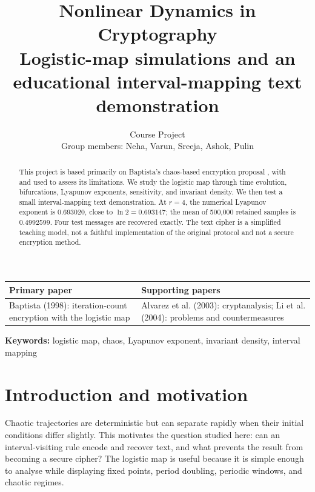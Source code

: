\documentclass[9pt]{article}
\title{Nonlinear Dynamics in Cryptography\\\large Logistic-map simulations and an educational interval-mapping text demonstration}
\author{Course Project\\\small Group members: Neha, Varun, Sreeja, Ashok, Pulin}\date{}
\begin{document}
\maketitle
\begin{abstract}
This project is based primarily on Baptista's chaos-based encryption proposal
\citep{Baptista1998}, with \citet{Alvarez2003} and \citet{Li2004} used to
assess its limitations. We study the logistic map through time evolution,
bifurcations, Lyapunov exponents, sensitivity, and invariant density. We then
test a small interval-mapping text demonstration. At $r=4$, the numerical
Lyapunov exponent is 0.693020, close to $\ln2=0.693147$; the mean of 500,000
retained samples is 0.4992599. Four test messages are recovered exactly. The
text cipher is a simplified teaching model, not a faithful implementation of
the original protocol and not a secure encryption method.
\end{abstract}
\begin{center}\small
\begin{tabular}{p{.43\linewidth}p{.43\linewidth}}\toprule
\textbf{Primary paper} & \textbf{Supporting papers}\\\midrule
Baptista (1998): iteration-count encryption with the logistic map & Alvarez et al. (2003): cryptanalysis; Li et al. (2004): problems and countermeasures\\\bottomrule
\end{tabular}
\end{center}
\vfill\begin{center}\small\textbf{Keywords:} logistic map, chaos, Lyapunov exponent, invariant density, interval mapping\end{center}
\clearpage

\section{Introduction and motivation}
Chaotic trajectories are deterministic but can separate rapidly when their
initial conditions differ slightly. This motivates the question studied here:
can an interval-visiting rule encode and recover text, and what prevents the
result from becoming a secure cipher? The logistic map is useful because it is
simple enough to analyse while displaying fixed points, period doubling,
periodic windows, and chaotic regimes.
\end{document}
